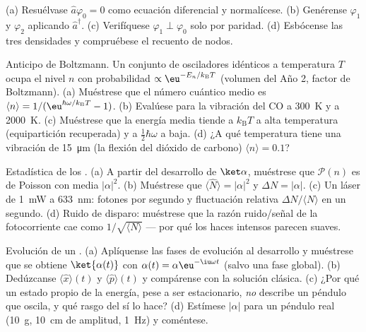 \begin{exercise}[$\star\star$]\label{exo:b3:harmonic-oscillator:5}
(a) Resuélvase $\hat a\varphi_0 = 0$ como ecuación diferencial y
normalícese. (b) Genérense $\varphi_1$ y $\varphi_2$ aplicando
$\hat a^\dagger$. (c) Verifíquese $\varphi_1 \perp \varphi_0$ solo por
paridad. (d) Esbócense las tres densidades y compruébese el recuento de nodos.
\end{exercise}

\begin{exercise}[$\star\star$]\label{exo:b3:harmonic-oscillator:6}
Anticipo de Boltzmann. Un conjunto de osciladores idénticos a temperatura
$T$ ocupa el nivel $n$ con probabilidad $\propto
\eu^{-E_n/k_{\text{B}}T}$ (volumen del Año 2, factor de Boltzmann). (a)
Muéstrese que el número cuántico medio es $\langle n\rangle =
1/(\eu^{\hbar\omega/k_{\text{B}}T} - 1)$. (b) Evalúese para la vibración
del CO a \qty{300}{K} y a \qty{2000}{K}. (c) Muéstrese que la energía media
tiende a $k_{\text{B}}T$ a alta temperatura (equipartición recuperada) y a
$\tfrac12\hbar\omega$ a baja. (d) ¿A qué temperatura tiene una vibración de
\qty{15}{\micro m} (la flexión del dióxido de carbono) $\langle n\rangle = 0.1$?
\end{exercise}

\begin{exercise}[$\star\star$]\label{exo:b3:harmonic-oscillator:7}
Estadística de los . (a) A partir del desarrollo de
$\ket\alpha$, muéstrese que $\mathcal P(n)$ es de Poisson con media
$|\alpha|^2$. (b) Muéstrese que $\langle\hat N\rangle = |\alpha|^2$ y
$\Delta N = |\alpha|$. (c) Un láser de \qty{1}{mW} a \qty{633}{nm}: fotones
por segundo y fluctuación relativa $\Delta N/\langle N\rangle$ en un
segundo. (d) Ruido de disparo: muéstrese que la razón ruido/señal de la
fotocorriente cae como $1/\sqrt{\langle N\rangle}$ --- por qué los haces
intensos parecen suaves.
\end{exercise}

\begin{exercise}[$\star\star$]\label{exo:b3:harmonic-oscillator:8}
Evolución de un . (a) Aplíquense las fases de evolución al
desarrollo y muéstrese que se obtiene $\ket{\alpha(t)}$ con $\alpha(t) =
\alpha\eu^{-\iu\omega t}$ (salvo una fase global). (b) Dedúzcanse
$\langle\hat x\rangle(t)$ y $\langle\hat p\rangle(t)$ y compárense
con la solución clásica. (c) ¿Por qué un estado propio de la energía, pese a
ser estacionario, \emph{no} describe un péndulo que oscila, y qué rasgo del
 sí lo hace? (d) Estímese $|\alpha|$ para un péndulo real
(\qty{10}{g}, \qty{10}{cm} de amplitud, \qty{1}{Hz}) y coméntese.
\end{exercise}

